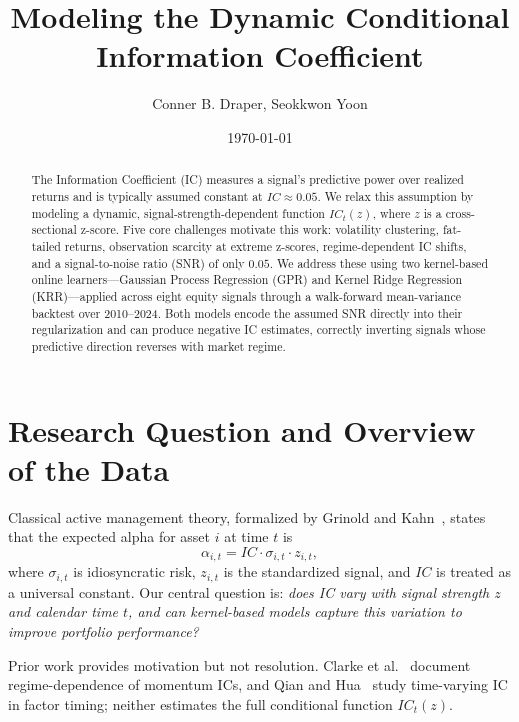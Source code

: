 \documentclass[11pt]{amsart}
\begin{document}
\title{Modeling the Dynamic Conditional Information Coefficient}
\author{Conner B. Draper, Seokkwon Yoon}

\date{\today}

\maketitle

\begin{abstract}
The Information Coefficient (IC) measures a signal's predictive power over
realized returns and is typically assumed constant at $IC \approx 0.05$.
We relax this assumption by modeling a dynamic, signal-strength-dependent
function $IC_t(z)$, where $z$ is a cross-sectional z-score.
Five core challenges motivate this work: volatility clustering, fat-tailed
returns, observation scarcity at extreme z-scores, regime-dependent IC
shifts, and a signal-to-noise ratio (SNR) of only $0.05$.
We address these using two kernel-based online learners---Gaussian Process
Regression (GPR) and Kernel Ridge Regression (KRR)---applied across eight
equity signals through a walk-forward mean-variance backtest over 2010--2024.
Both models encode the assumed SNR directly into their regularization and
can produce negative IC estimates, correctly inverting signals whose
predictive direction reverses with market regime.
\end{abstract}

\section{Research Question and Overview of the Data}

Classical active management theory, formalized by Grinold and
Kahn~\cite{GrinoldKahn1999}, states that the expected alpha for asset $i$
at time $t$ is
\[
  \alpha_{i,t} = IC \cdot \sigma_{i,t} \cdot z_{i,t},
\]
where $\sigma_{i,t}$ is idiosyncratic risk, $z_{i,t}$ is the standardized
signal, and $IC$ is treated as a universal constant.
Our central question is: \emph{does IC vary with signal strength $z$ and
calendar time $t$, and can kernel-based models capture this variation to improve portfolio performance?}

Prior work provides motivation but not resolution.  Clarke et
al.~\cite{Clarke2002} document regime-dependence of momentum ICs, and Qian
and Hua~\cite{QianHua2004} study time-varying IC in factor timing; neither
estimates the full conditional function $IC_t(z)$.
\end{document}

